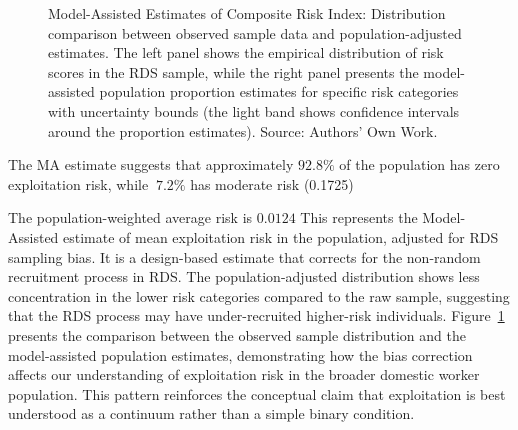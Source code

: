 \documentclass[
  12pt,
  letterpaper,
  DIV=11,
  numbers=noendperiod]{scrartcl}
\theoremstyle{plain}
\theoremstyle{definition}
\begin{document}
\begin{figure}[H]


\caption{\label{fig-ma-risk-estimates}Model-Assisted Estimates of
Composite Risk Index: Distribution comparison between observed sample
data and population-adjusted estimates. The left panel shows the
empirical distribution of risk scores in the RDS sample, while the right
panel presents the model-assisted population proportion estimates for
specific risk categories with uncertainty bounds (the light band shows
confidence intervals around the proportion estimates). Source: Authors'
Own Work.}

\end{figure}%

The MA estimate suggests that approximately \(92.8\%\) of the population
has zero exploitation risk, while \(~7.2\%\) has moderate risk (0.1725)

The population-weighted average risk is \(0.0124\) This represents the
Model-Assisted estimate of mean exploitation risk in the population,
adjusted for RDS sampling bias. It is a design-based estimate that
corrects for the non-random recruitment process in RDS. The
population-adjusted distribution shows less concentration in the lower
risk categories compared to the raw sample, suggesting that the RDS
process may have under-recruited higher-risk individuals.
Figure~\ref{fig-ma-risk-estimates} presents the comparison between the
observed sample distribution and the model-assisted population
estimates, demonstrating how the bias correction affects our
understanding of exploitation risk in the broader domestic worker
population. This pattern reinforces the conceptual claim that
exploitation is best understood as a continuum rather than a simple
binary condition.
\end{document}
